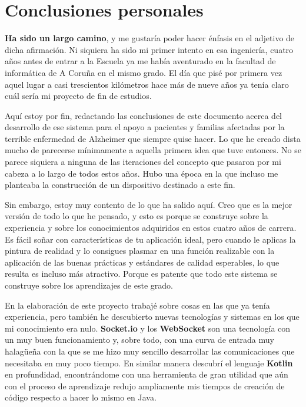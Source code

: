 \chapter{Conclusiones personales}
\label{ch:conclusiones_personales}

\textbf{Ha sido un largo camino}, y me gustaría poder hacer énfasis en el adjetivo de dicha afirmación. Ni siquiera ha sido mi primer intento en esa ingeniería, cuatro años antes de entrar a la Escuela ya me había aventurado en la facultad de informática de A Coruña en el mismo grado. El día que pisé por primera vez aquel lugar a casi trescientos kilómetros hace más de nueve años ya tenía claro cuál sería mi proyecto de fin de estudios. 

Aquí estoy por fin, redactando las conclusiones de este documento acerca del desarrollo de ese sistema para el apoyo a pacientes y familias afectadas por la terrible enfermedad de Alzheimer que siempre quise hacer. Lo que he creado dista mucho de parecerse mínimamente a aquella primera idea que tuve entonces. No se parece siquiera a ninguna de las iteraciones del concepto que pasaron por mi cabeza a lo largo de todos estos años. Hubo una época en la que incluso me planteaba la construcción de un dispositivo destinado a este fin.

Sin embargo, estoy muy contento de lo que ha salido aquí. Creo que es la mejor versión de todo lo que he pensado, y esto es porque se construye sobre la experiencia y sobre los conocimientos adquiridos en estos cuatro años de carrera. Es fácil soñar con características de tu aplicación ideal, pero cuando le aplicas la pintura de realidad y lo consigues plasmar en una función realizable con la aplicación de las buenas prácticas y estándares de calidad esperables, lo que resulta es incluso más atractivo. Porque es patente que todo este sistema se construye sobre los aprendizajes de este grado. 

En la elaboración de este proyecto trabajé sobre cosas en las que ya tenía experiencia, pero también he descubierto nuevas tecnologías y sistemas en los que mi conocimiento era nulo. \textbf{Socket.io} y los \textbf{WebSocket} son una tecnología con un muy buen funcionamiento y, sobre todo, con una curva de entrada muy halagüeña con la que se me hizo muy sencillo desarrollar las comunicaciones que necesitaba en muy poco tiempo. En similar manera descubrí el lenguaje \textbf{Kotlin} en profundidad, encontrándome con una herramienta de gran utilidad que aún con el proceso de aprendizaje redujo ampliamente mis tiempos de creación de código respecto a hacer lo mismo en Java.

